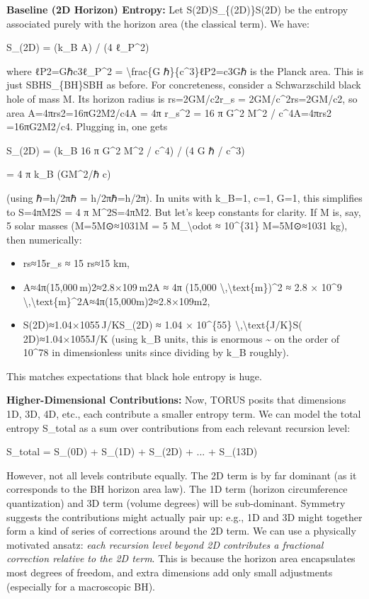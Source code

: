 \documentclass[]{article}
\begin{document}
\textbf{Baseline (2D Horizon) Entropy:} Let S(2D)S\_\{(2D)\}S(2D)​ be
the entropy associated purely with the horizon area (the classical
term). We have:

S\_(2D) = (k\_B A) / (4 ℓ\_P\^{}2)

where ℓP2=Gℏc3ℓ\_P\^{}2 = \textbackslash{}frac\{G
ℏ\}\{c\^{}3\}ℓP2​=c3Gℏ​ is the Planck area. This is just
SBHS\_\{BH\}SBH​ as before. For concreteness, consider a Schwarzschild
black hole of mass M. Its horizon radius is rs=2GM/c2r\_s =
2GM/c\^{}2rs​=2GM/c2, so area A=4πrs2=16πG2M2/c4A = 4π r\_s\^{}2 = 16 π
G\^{}2 M\^{}2 / c\^{}4A=4πrs2​=16πG2M2/c4. Plugging in, one gets

S\_(2D) = (k\_B 16 π G\^{}2 M\^{}2 / c\^{}4) / (4 G ℏ / c\^{}3)

= 4 π k\_B (GM\^{}2/ℏ c)

(using ℏ=h/2πℏ = h/2πℏ=h/2π). In units with k\_B=1, c=1, G=1, this
simplifies to S=4πM2S = 4 π M\^{}2S=4πM2. But let's keep constants for
clarity. If M is, say, 5 solar masses (M=5M⊙≈1031M = 5
M\_\textbackslash{}odot ≈ 10\^{}\{31\} M=5M⊙​≈1031 kg), then
numerically:

\begin{itemize}
\item
  rs≈15r\_s ≈ 15 rs​≈15 km,
\item
  A≈4π(15,000 m)2≈2.8×109 m2A ≈ 4π (15,000
  \textbackslash{},\textbackslash{}text\{m\})\^{}2 ≈ 2.8 × 10\^{}9
  \textbackslash{},\textbackslash{}text\{m\}\^{}2A≈4π(15,000m)2≈2.8×109m2,
\item
  S(2D)≈1.04×1055 J/KS\_(2D) ≈ 1.04 × 10\^{}\{55\}
  \textbackslash{},\textbackslash{}text\{J/K\}S(​2D)≈1.04×1055J/K (using
  k\_B units, this is enormous \textasciitilde{} on the order of
  10\^{}78 in dimensionless units since dividing by k\_B roughly).
\end{itemize}

This matches expectations that black hole entropy is huge.

\textbf{Higher-Dimensional Contributions:} Now, TORUS posits that
dimensions 1D, 3D, 4D, etc., each contribute a smaller entropy term. We
can model the total entropy S\_total as a sum over contributions from
each relevant recursion level:

S\_total = S\_(0D) + S\_(1D) + S\_(2D) + ... + S\_(13D)

However, not all levels contribute equally. The 2D term is by far
dominant (as it corresponds to the BH horizon area law). The 1D term
(horizon circumference quantization) and 3D term (volume degrees) will
be sub-dominant. Symmetry suggests the contributions might actually pair
up: e.g., 1D and 3D might together form a kind of series of corrections
around the 2D term. We can use a physically motivated ansatz: \emph{each
recursion level beyond 2D contributes a fractional correction relative
to the 2D term}. This is because the horizon area encapsulates most
degrees of freedom, and extra dimensions add only small adjustments
(especially for a macroscopic BH).
\end{document}
